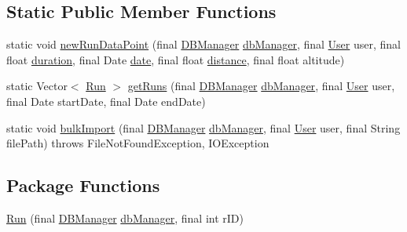 \subsection*{Static Public Member Functions}
\begin{DoxyCompactItemize}
\item 
static void \hyperlink{classcom_1_1activitytracker_1_1_run_a5dea6f1860431103d553ce770382afe0}{new\+Run\+Data\+Point} (final \hyperlink{classcom_1_1activitytracker_1_1_d_b_manager}{D\+B\+Manager} \hyperlink{classcom_1_1activitytracker_1_1_run_ab90e32eda9f4c671ae3575f971edca6b}{db\+Manager}, final \hyperlink{classcom_1_1activitytracker_1_1_user}{User} user, final float \hyperlink{classcom_1_1activitytracker_1_1_run_a5e38d293d29d4b65c9290ff4bee82e03}{duration}, final Date \hyperlink{classcom_1_1activitytracker_1_1_run_a66934b1f4fe6bc74a4e98574a2892764}{date}, final float \hyperlink{classcom_1_1activitytracker_1_1_run_a7b4ca8c4ecea4da1653f03b8c8fc16a8}{distance}, final float altitude)
\item 
static Vector$<$ \hyperlink{classcom_1_1activitytracker_1_1_run}{Run} $>$ \hyperlink{classcom_1_1activitytracker_1_1_run_a1aa1fb01eabff586e16d88f19f7df743}{get\+Runs} (final \hyperlink{classcom_1_1activitytracker_1_1_d_b_manager}{D\+B\+Manager} \hyperlink{classcom_1_1activitytracker_1_1_run_ab90e32eda9f4c671ae3575f971edca6b}{db\+Manager}, final \hyperlink{classcom_1_1activitytracker_1_1_user}{User} user, final Date start\+Date, final Date end\+Date)
\item 
static void \hyperlink{classcom_1_1activitytracker_1_1_run_a8e2b13e0096b87614d5333ec15213300}{bulk\+Import} (final \hyperlink{classcom_1_1activitytracker_1_1_d_b_manager}{D\+B\+Manager} \hyperlink{classcom_1_1activitytracker_1_1_run_ab90e32eda9f4c671ae3575f971edca6b}{db\+Manager}, final \hyperlink{classcom_1_1activitytracker_1_1_user}{User} user, final String file\+Path)  throws File\+Not\+Found\+Exception, I\+O\+Exception 
\end{DoxyCompactItemize}
\subsection*{Package Functions}
\begin{DoxyCompactItemize}
\item 
\hyperlink{classcom_1_1activitytracker_1_1_run_a5568c1c514835056d2abc22cfba222c5}{Run} (final \hyperlink{classcom_1_1activitytracker_1_1_d_b_manager}{D\+B\+Manager} \hyperlink{classcom_1_1activitytracker_1_1_run_ab90e32eda9f4c671ae3575f971edca6b}{db\+Manager}, final int r\+ID)
\end{DoxyCompactItemize}
